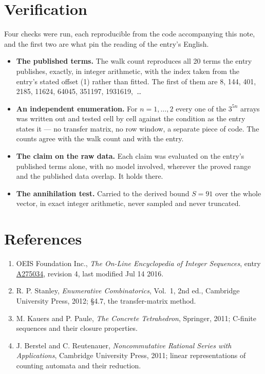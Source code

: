 \documentclass[11pt]{article}
\theoremstyle{definition}
\begin{document}
\section{Verification}

Four checks were run, each reproducible from the code accompanying this note, and the first two are what pin the reading of the entry's English.

\begin{itemize}

\item {\bfseries The published terms.} The walk count reproduces all 20 terms the entry publishes, exactly, in integer arithmetic, with the index taken from the entry's stated offset (1) rather than fitted. The first of them are 8, 144, 401, 2185, 11624, 64045, 351197, 1931619,~\dots

\item {\bfseries An independent enumeration.} For $n = 1,\dots,2$ every one of the $3^{5n}$ arrays was written out and tested cell by cell against the condition as the entry states it --- no transfer matrix, no row window, a separate piece of code. The counts agree with the walk count and with the entry.

\item {\bfseries The claim on the raw data.} Each claim was evaluated on the entry's published terms alone, with no model involved, wherever the proved range and the published data overlap. It holds there.

\item {\bfseries The annihilation test.} Carried to the derived bound $S = 91$ over the whole vector, in exact integer arithmetic, never sampled and never truncated.

\end{itemize}

\section{References}

\begin{enumerate}

\item OEIS Foundation Inc., \emph{The On-Line Encyclopedia of Integer Sequences}, entry \href{https://oeis.org/A275034}{A275034}, revision 4, last modified Jul 14 2016.

\item R. P. Stanley, \emph{Enumerative Combinatorics}, Vol.~1, 2nd ed., Cambridge University Press, 2012; \S4.7, the transfer-matrix method.

\item M. Kauers and P. Paule, \emph{The Concrete Tetrahedron}, Springer, 2011; C-finite sequences and their closure properties.

\item J. Berstel and C. Reutenauer, \emph{Noncommutative Rational Series with Applications}, Cambridge University Press, 2011; linear representations of counting automata and their reduction.

\end{enumerate}
\end{document}
